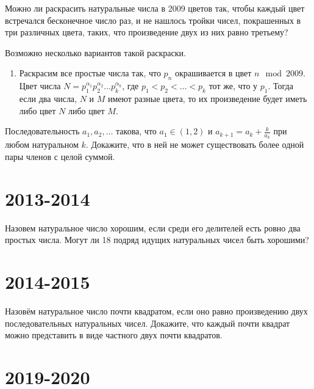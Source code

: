 \documentclass[11pt, a4paper]{common/document_template}
\begin{document}
\begin{exercise}
Можно ли раскрасить натуральные числа в 2009 цветов так, чтобы каждый цвет встречался бесконечное число раз, и не нашлось тройки чисел, покрашенных в три различных цвета, таких, что произведение двух из них равно третьему?
\end{exercise}

\begin{Solution}
Возможно несколько вариантов такой раскраски.
\begin{enumerate}
\item Раскрасим все простые числа так, что $p_{n}$ окрашивается в цвет $n \mod 2009$. Цвет числа $N = p_{1}^{\alpha_{1}} p_{2}^{\alpha_{2}} \dots p_{k}^{\alpha_{k}}$, где $p_{1} < p_{2} < \dots < p_{k}$ тот же, что у $p_{1}$. Тогда если два числа, $N$ и $M$ имеют разные цвета, то их произведение будет иметь либо цвет $N$ либо цвет $M$.
\end{enumerate}
\end{Solution}

\begin{exercise}
Последовательность $a_{1}, a_{2}, \dots$ такова, что $a_{1} \in (1, 2)$ и $a_{k+1} = a_{k} + \frac{k}{a_{k}}$ при любом натуральном $k$. Докажите, что в ней не может существовать более одной пары членов с целой суммой.
\end{exercise}

\chapter{2013-2014}

\begin{exercise} 
Назовем натуральное число хорошим, если среди его делителей есть ровно два простых числа. Могут ли 18 подряд идущих натуральных чисел быть хорошими?
\end{exercise}

\chapter{2014-2015}

\begin{exercise}
Назовём натуральное число почти квадратом, если оно равно произведению двух последовательных натуральных чисел. Докажите, что каждый почти квадрат можно представить в виде частного двух почти квадратов.
\end{exercise}


\chapter{2019-2020}
\end{document}
